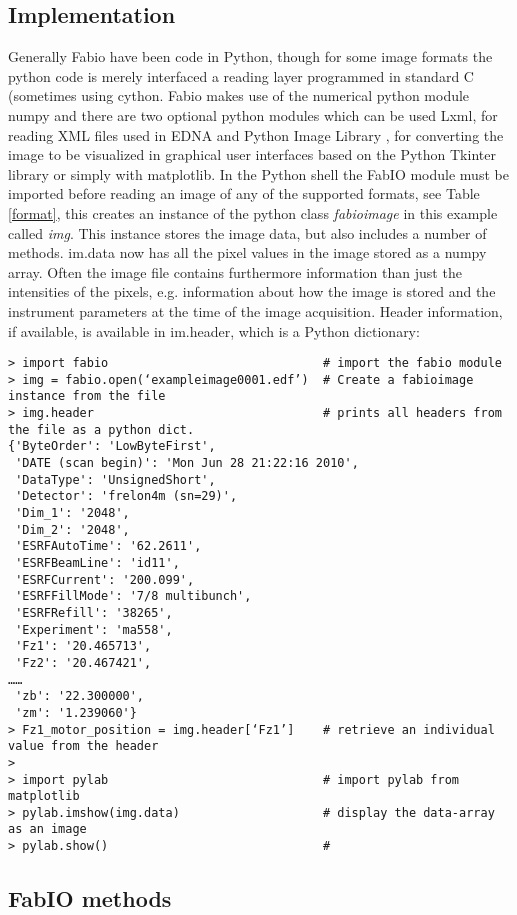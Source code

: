 \documentclass{iucr}
\begin{document}
\subsection{Implementation}

Generally Fabio have been code in Python\cite{python},
though for some image formats the python code is merely interfaced a reading 
layer programmed in standard C (sometimes using cython\cite{cython}.
Fabio makes use of the numerical python module numpy\cite{numpy} and there are
two optional python modules which can be used Lxml, for reading XML files
used in EDNA\cite{edna} and Python Image Library
\cite{pil}, for converting the image to be visualized in graphical user
interfaces based on the Python Tkinter library\cite{???} or simply with matplotlib\cite{matplotlib}. 
In the Python shell the FabIO module must be imported before reading an image of any of the supported formats, see Table \ref{format},  
this creates an instance of the python class {\em fabioimage} in this example called {\em img}.
This instance stores the image data, but also includes a number of methods.
im.data now has all the pixel values in the image stored as a numpy array. 
Often the image file contains furthermore information than just the intensities of the pixels, 
e.g. information about how the image is stored and the instrument parameters at the time of the image acquisition.
 Header information, if available, is available in im.header, which is
 a Python dictionary: 

\begin{verbatim}
> import fabio 								# import the fabio module 
> img = fabio.open(‘exampleimage0001.edf’) 	# Create a fabioimage instance from the file
> img.header 								# prints all headers from the file as a python dict. 
{'ByteOrder': 'LowByteFirst',
 'DATE (scan begin)': 'Mon Jun 28 21:22:16 2010',
 'DataType': 'UnsignedShort',
 'Detector': 'frelon4m (sn=29)',
 'Dim_1': '2048',
 'Dim_2': '2048',
 'ESRFAutoTime': '62.2611',
 'ESRFBeamLine': 'id11',
 'ESRFCurrent': '200.099',
 'ESRFFillMode': '7/8 multibunch',
 'ESRFRefill': '38265',
 'Experiment': 'ma558',
 'Fz1': '20.465713',
 'Fz2': '20.467421',
……
 'zb': '22.300000',
 'zm': '1.239060'}
> Fz1_motor_position = img.header[‘Fz1’] 	# retrieve an individual value from the header
>
> import pylab								# import pylab from matplotlib  
> pylab.imshow(img.data)					# display the data-array as an image
> pylab.show()								# 
\end{verbatim}

\subsection{FabIO methods}
\end{document}
